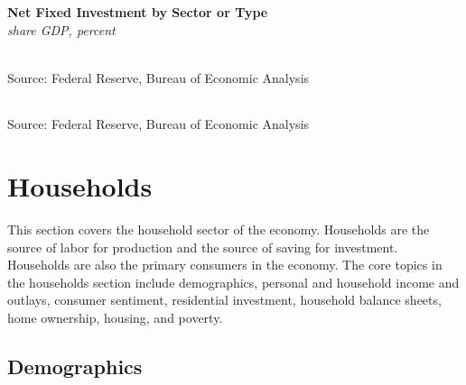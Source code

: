 \documentclass{report}
\makeatletter
\newcommand{\tbllink}[1]{\href{https://raw.githubusercontent.com/bdecon/US-chartbook/master/chartbook/data/#1}{\faTable}}
\newcommand*\short[1]{\expandafter\@gobbletwo\number\numexpr#1\relax}
\newcommand{\sbar}[4]{
		\addplot[ybar stacked, bar width=2.4pt, draw opacity=0, fill=#1] 
			table [x=#2, y=#3, col sep=comma]{#4};}
\newcommand{\dateaxisticks}{
		date coordinates in=x, axis line style={draw=none},
		xmax={2022-10-31},
		max space between ticks=40,	    
		xtick={{1990-01-01}, {1992-01-01}, {1994-01-01}, 
			{1996-01-01}, {1998-01-01}, {2000-01-01}, 
			{2002-01-01}, {2004-01-01}, {2006-01-01},
			{2008-01-01}, {2010-01-01}, {2012-01-01}, {2014-01-01},
		    {2016-01-01}, {2018-01-01}, {2020-01-01}, {2022-01-01}, 
		    {2024-01-01}, {2026-01-01}},
		minor xtick={{1989-01-01}, {1991-01-01}, {1993-01-01},
			{1995-01-01}, {1997-01-01}, {1999-01-01}, 
			{2001-01-01}, {2003-01-01}, {2005-01-01}, {2007-01-01},
		    {2009-01-01}, {2011-01-01}, {2013-01-01}, {2015-01-01},
		    {2017-01-01}, {2019-01-01}, {2021-01-01}, {2023-01-01}, 
		    {2025-01-01}, {2027-01-01}},
		enlarge y limits={0.06}, enlarge x limits={0.01},
		}
\newcommand{\bbar}[2]{extra #1 ticks = {{#2}}, extra #1 tick labels = ,
		extra #1 tick style = {grid=major, grid style={thick, black!25}},}
\newcommand{\rbars}{
		\fill[color=black!10] (axis cs:{1990-07-01},\pgfkeysvalueof{/pgfplots/ymin}) rectangle 
			(axis cs:{1991-03-01}, \pgfkeysvalueof{/pgfplots/ymax});
		\fill[color=black!10] (axis cs:{2007-12-01},\pgfkeysvalueof{/pgfplots/ymin}) rectangle 
			(axis cs:{2009-07-01}, \pgfkeysvalueof{/pgfplots/ymax});
		\fill[color=black!10] (axis cs:{2001-03-01},\pgfkeysvalueof{/pgfplots/ymin}) rectangle 
			(axis cs:{2001-11-01}, \pgfkeysvalueof{/pgfplots/ymax});
		\fill[color=black!10] (axis cs:{2020-02-01},\pgfkeysvalueof{/pgfplots/ymin}) rectangle 
			(axis cs:{2020-05-01}, \pgfkeysvalueof{/pgfplots/ymax});}
\makeatother
\begin{document}
{\begin{minipage}{0.76\textwidth}
\normalsize \textbf{Net Fixed Investment by Sector or Type}\\
\footnotesize{\textit{share GDP, percent}}\\
\hspace*{-2mm} \\
\footnotesize{Source: Federal Reserve, Bureau of Economic Analysis} \hfill \tbllink{z1_nfi.csv}

 \setlength{\tabcolsep}{3.5pt} \color{black!90}
		{\renewcommand{\arraystretch}{1.5}
		 \begin{tabular}{p{42mm} R{7.8mm} R{7.8mm} R{7.8mm} R{7.8mm} 
		   R{8.2mm} R{8.2mm} R{8.2mm} }
			  \hline
		\end{tabular}}	\vspace{-2mm}
		
\footnotesize{Source: Federal Reserve, Bureau of Economic Analysis}
\end{minipage}
\newpage
\hypertarget{hh}{}
\section*{Households}
\begin{minipage}{0.76\textwidth}
\small This section covers the household sector of the economy. Households are the source of labor for production and the source of saving for investment. Households are also the primary consumers in the economy. The core topics in the households section include demographics, personal and household income and outlays, consumer sentiment, residential investment, household balance sheets, home ownership, housing, and poverty.

\hypertarget{hhdem}{}
\subsection*{Demographics}
\vspace{-1.0mm}


\end{minipage}}
\end{document}
